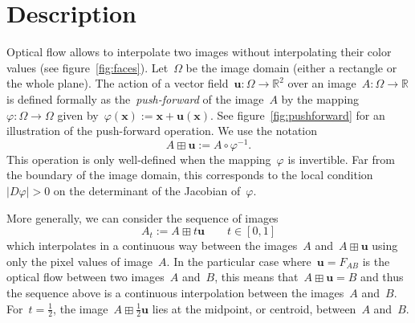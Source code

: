 \documentclass{ipol}
\def\R{\mathbb{R}}
\def\x{\mathbf{x}}
\def\u{\mathbf{u}}
\begin{document}
%
%
%
%
%


\section{Description}
Optical flow allows to interpolate two images without interpolating their
color values (see figure~\ref{fig:faces}).
Let~$\Omega$ be the image domain (either a rectangle or the whole plane).
The action of a vector
field~\mbox{$\u:\Omega\to\R^2$} over an image~$A:\Omega\to\R$ is defined formally as
the~\emph{push-forward} of the image~$A$ by the
mapping~$\varphi:\Omega\to\Omega$ given by~$\varphi(\x):=\x+\u(\x)$.  See
figure~\ref{fig:pushforward} for an illustration of the push-forward
operation.  We use the notation
\[
A\boxplus\u := A\circ\varphi^{-1}.
\]
This operation is only well-defined when the mapping~$\varphi$ is invertible.
Far from the boundary of the image domain,
this corresponds to the local
condition~$|D\varphi|>0$ on the determinant of the 
Jacobian of~$\varphi$. %
\par
More generally, we can consider the sequence of images
\[
A_t := A\boxplus t\u\qquad t\in[0,1]
\]
which interpolates in a continuous way between the images~$A$
and~$A\boxplus\u$ using only the pixel values of image~$A$.  In the particular
case where~$\u=F_{AB}$ is the optical flow between two images~$A$ and~$B$, this means
that~$A\boxplus\u=B$ and thus the sequence above is a continuous interpolation
between the images~$A$ and~$B$.  For~$t=\frac{1}{2}$, the
image~$A\boxplus\frac{1}{2}\u$ lies at the midpoint, or centroid, between~$A$
and~$B$.
\end{document}
